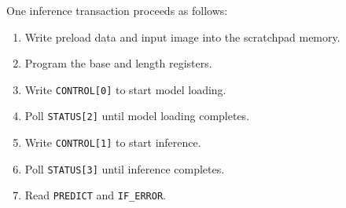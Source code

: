 One inference transaction proceeds as follows:
\begin{enumerate}
\item Write preload data and input image into the scratchpad memory.
\item Program the base and length registers.
\item Write \texttt{CONTROL[0]} to start model loading.
\item Poll \texttt{STATUS[2]} until model loading completes.
\item Write \texttt{CONTROL[1]} to start inference.
\item Poll \texttt{STATUS[3]} until inference completes.
\item Read \texttt{PREDICT} and \texttt{IF\_ERROR}.
\end{enumerate}

